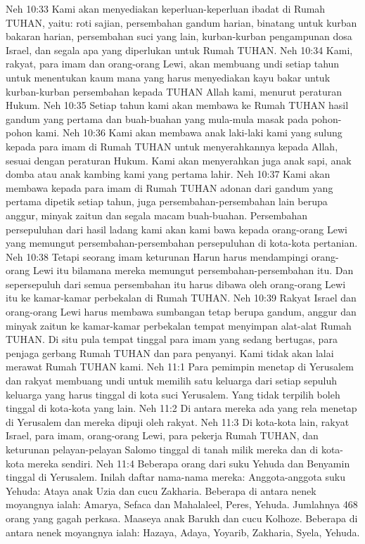 Neh 10:33  Kami akan menyediakan keperluan-keperluan ibadat di Rumah TUHAN, yaitu: roti sajian, persembahan gandum harian, binatang untuk kurban bakaran harian, persembahan suci yang lain, kurban-kurban pengampunan dosa Israel, dan segala apa yang diperlukan untuk Rumah TUHAN.
Neh 10:34  Kami, rakyat, para imam dan orang-orang Lewi, akan membuang undi setiap tahun untuk menentukan kaum mana yang harus menyediakan kayu bakar untuk kurban-kurban persembahan kepada TUHAN Allah kami, menurut peraturan Hukum.
Neh 10:35  Setiap tahun kami akan membawa ke Rumah TUHAN hasil gandum yang pertama dan buah-buahan yang mula-mula masak pada pohon-pohon kami.
Neh 10:36  Kami akan membawa anak laki-laki kami yang sulung kepada para imam di Rumah TUHAN untuk menyerahkannya kepada Allah, sesuai dengan peraturan Hukum. Kami akan menyerahkan juga anak sapi, anak domba atau anak kambing kami yang pertama lahir.
Neh 10:37  Kami akan membawa kepada para imam di Rumah TUHAN adonan dari gandum yang pertama dipetik setiap tahun, juga persembahan-persembahan lain berupa anggur, minyak zaitun dan segala macam buah-buahan. Persembahan persepuluhan dari hasil ladang kami akan kami bawa kepada orang-orang Lewi yang memungut persembahan-persembahan persepuluhan di kota-kota pertanian.
Neh 10:38  Tetapi seorang imam keturunan Harun harus mendampingi orang-orang Lewi itu bilamana mereka memungut persembahan-persembahan itu. Dan sepersepuluh dari semua persembahan itu harus dibawa oleh orang-orang Lewi itu ke kamar-kamar perbekalan di Rumah TUHAN.
Neh 10:39  Rakyat Israel dan orang-orang Lewi harus membawa sumbangan tetap berupa gandum, anggur dan minyak zaitun ke kamar-kamar perbekalan tempat menyimpan alat-alat Rumah TUHAN. Di situ pula tempat tinggal para imam yang sedang bertugas, para penjaga gerbang Rumah TUHAN dan para penyanyi. Kami tidak akan lalai merawat Rumah TUHAN kami.
Neh 11:1  Para pemimpin menetap di Yerusalem dan rakyat membuang undi untuk memilih satu keluarga dari setiap sepuluh keluarga yang harus tinggal di kota suci Yerusalem. Yang tidak terpilih boleh tinggal di kota-kota yang lain.
Neh 11:2  Di antara mereka ada yang rela menetap di Yerusalem dan mereka dipuji oleh rakyat.
Neh 11:3  Di kota-kota lain, rakyat Israel, para imam, orang-orang Lewi, para pekerja Rumah TUHAN, dan keturunan pelayan-pelayan Salomo tinggal di tanah milik mereka dan di kota-kota mereka sendiri.
Neh 11:4  Beberapa orang dari suku Yehuda dan Benyamin tinggal di Yerusalem. Inilah daftar nama-nama mereka: Anggota-anggota suku Yehuda: Ataya anak Uzia dan cucu Zakharia. Beberapa di antara nenek moyangnya ialah: Amarya, Sefaca dan Mahalaleel, Peres, Yehuda. Jumlahnya 468 orang yang gagah perkasa. Maaseya anak Barukh dan cucu Kolhoze. Beberapa di antara nenek moyangnya ialah: Hazaya, Adaya, Yoyarib, Zakharia, Syela, Yehuda.
